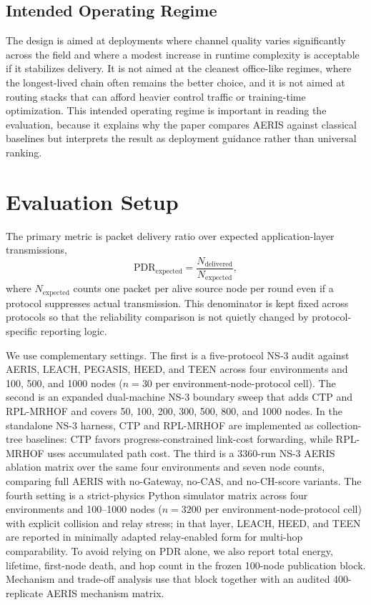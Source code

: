 \documentclass[conference]{IEEEtran}
\begin{document}
\subsection{Intended Operating Regime}
The design is aimed at deployments where channel quality varies significantly across the field and where a modest increase in runtime complexity is acceptable if it stabilizes delivery. It is not aimed at the cleanest office-like regimes, where the longest-lived chain often remains the better choice, and it is not aimed at routing stacks that can afford heavier control traffic or training-time optimization. This intended operating regime is important in reading the evaluation, because it explains why the paper compares AERIS against classical baselines but interprets the result as deployment guidance rather than universal ranking.

\section{Evaluation Setup}
The primary metric is packet delivery ratio over expected application-layer transmissions,
\begin{equation}
\mathrm{PDR}_{\mathrm{expected}}=\frac{N_{\mathrm{delivered}}}{N_{\mathrm{expected}}},
\end{equation}
where $N_{\mathrm{expected}}$ counts one packet per alive source node per round even if a protocol suppresses actual transmission. This denominator is kept fixed across protocols so that the reliability comparison is not quietly changed by protocol-specific reporting logic.

We use complementary settings. The first is a five-protocol NS-3 audit against AERIS, LEACH, PEGASIS, HEED, and TEEN across four environments and 100, 500, and 1000 nodes ($n=30$ per environment-node-protocol cell). The second is an expanded dual-machine NS-3 boundary sweep that adds CTP and RPL-MRHOF and covers 50, 100, 200, 300, 500, 800, and 1000 nodes. In the standalone NS-3 harness, CTP and RPL-MRHOF are implemented as collection-tree baselines: CTP favors progress-constrained link-cost forwarding, while RPL-MRHOF uses accumulated path cost. The third is a 3360-run NS-3 AERIS ablation matrix over the same four environments and seven node counts, comparing full AERIS with no-Gateway, no-CAS, and no-CH-score variants. The fourth setting is a strict-physics Python simulator matrix across four environments and 100--1000 nodes ($n=3200$ per environment-node-protocol cell) with explicit collision and relay stress; in that layer, LEACH, HEED, and TEEN are reported in minimally adapted relay-enabled form for multi-hop comparability. To avoid relying on PDR alone, we also report total energy, lifetime, first-node death, and hop count in the frozen 100-node publication block. Mechanism and trade-off analysis use that block together with an audited 400-replicate AERIS mechanism matrix.
\end{document}
